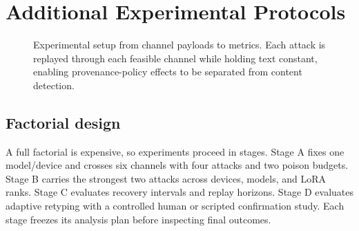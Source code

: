 \section{Additional Experimental Protocols}
\label{app:experiments}

\begin{figure}[t]
  \centering
  
  \caption{Experimental setup from channel payloads to metrics. Each attack is replayed through each feasible channel while holding text constant, enabling provenance-policy effects to be separated from content detection.}
  \label{fig:experimental-setup}
\end{figure}

\subsection{Factorial design}

A full factorial is expensive, so experiments proceed in stages. Stage A fixes one model/device and crosses six channels with four attacks and two poison budgets. Stage B carries the strongest two attacks across devices, models, and LoRA ranks. Stage C evaluates recovery intervals and replay horizons. Stage D evaluates adaptive retyping with a controlled human or scripted confirmation study. Each stage freezes its analysis plan before inspecting final outcomes.

\begin{table}[h]
\centering
\small
\caption{Planned experimental factors. Values are protocol settings, not results.}
\end{table}


